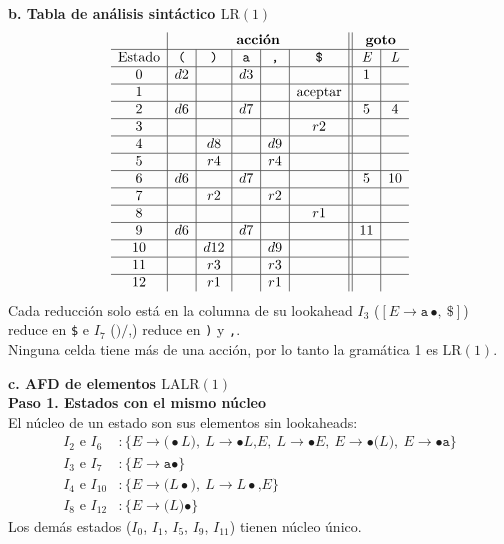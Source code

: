\documentclass[12pt,letterpaper]{article}
\newcommand{\nt}[1]{\textit{#1}}
\newcommand{\tk}[1]{\texttt{#1}}
\newcommand{\lr}{\mathrm{LR(1)}}
\newcommand{\lalr}{\mathrm{LALR(1)}}
\begin{document}
\begin{enumerate}[label=\arabic*.]
  \newpage

  \textbf{\large b. Tabla de análisis sintáctico $\lr$}\\
  \[
  \begin{array}{c|c|c|c|c|c||c|c}
    & \multicolumn{5}{c||}{\textbf{acción}} & \multicolumn{2}{c}{\textbf{goto}} \\ \hline
    \text{Estado} & \tk{(} & \tk{)} & \tk{a} & \tk{,} & \tk{\$} & \nt{E} & \nt{L} \\ \hline
    0  & d2 &     & d3 &     &    & 1 &    \\ \hline
    1  &    &     &    &     & \text{aceptar} &   &    \\ \hline
    2  & d6 &     & d7 &     &    & 5 & 4  \\ \hline
    3  &    &     &    &     & r2 &   &    \\ \hline
    4  &    & d8  &    & d9  &    &   &    \\ \hline
    5  &    & r4  &    & r4  &    &   &    \\ \hline
    6  & d6 &     & d7 &     &    & 5 & 10 \\ \hline
    7  &    & r2  &    & r2  &    &   &    \\ \hline
    8  &    &     &    &     & r1 &   &    \\ \hline
    9  & d6 &     & d7 &     &    & 11 &   \\ \hline
    10 &    & d12 &    & d9  &    &   &    \\ \hline
    11 &    & r3  &    & r3  &    &   &    \\ \hline
    12 &    & r1  &    & r1  &    &   &    \\
  \end{array}
  \]
  Cada reducción solo está en la columna de su lookahead $I_3$ ($[\nt{E}\to\tk{a}\,\bullet,\ \tk{\$}]$) reduce
  en \tk{\$} e $I_7$ ($\tk{)}/\tk{,}$) reduce en \tk{)} y \tk{,}.\\

  Ninguna celda tiene más de una acción, por lo tanto la gramática 1 es $\lr$.

  \bigskip

  \textbf{\large c. AFD de elementos $\lalr$}\\

  \textbf{Paso 1. Estados con el mismo núcleo}\\
  El núcleo de un estado son sus elementos sin lookaheads:
  \[
  \begin{aligned}
    I_2 \text{ e } I_6 &: \{\nt{E}\to\tk{(}\bullet\nt{L}\tk{)},\ \nt{L}\to\bullet\nt{L}\tk{,}\nt{E},\ \nt{L}\to\bullet\nt{E},\ \nt{E}\to\bullet\tk{(}\nt{L}\tk{)},\ \nt{E}\to\bullet\tk{a}\}\\
    I_3 \text{ e } I_7 &: \{\nt{E}\to\tk{a}\bullet\}\\
    I_4 \text{ e } I_{10} &: \{\nt{E}\to\tk{(}\nt{L}\bullet\tk{)},\ \nt{L}\to\nt{L}\bullet\tk{,}\nt{E}\}\\
    I_8 \text{ e } I_{12} &: \{\nt{E}\to\tk{(}\nt{L}\tk{)}\bullet\}
  \end{aligned}
  \]
  Los demás estados ($I_0$, $I_1$, $I_5$, $I_9$, $I_{11}$) tienen núcleo único.\\


\end{enumerate}
\end{document}
